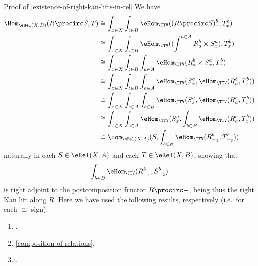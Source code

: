 \begin{Proof}{Proof of \cref{existence-of-right-kan-lifts-in-rel}}%
    We have
    \begingroup\small
    \begin{align*}
        \Hom_{\eRel(X,B)}(R\procirc S,T) &\cong  \int_{x\in X}\int_{b\in B}\eHom_{\TTV}((R\procirc S)^{b}_{x},T^{b}_{x})\\
                                         &\cong  \int_{x\in X}\int_{b\in B}\eHom_{\TTV}((\int^{a\in A}R^{b}_{a}\times S^{a}_{x}),T^{b}_{x})\\
                                         &\cong  \int_{x\in X}\int_{b\in B}\int_{a\in A}\eHom_{\TTV}(R^{b}_{a}\times S^{a}_{x},T^{b}_{x})\\
                                         &\cong  \int_{x\in X}\int_{b\in B}\int_{a\in A}\eHom_{\TTV}(S^{a}_{x},\eHom_{\TTV}(R^{b}_{a},T^{b}_{x}))\\
                                         &\cong  \int_{x\in X}\int_{a\in A}\int_{b\in B}\eHom_{\TTV}(S^{a}_{x},\eHom_{\TTV}(R^{b}_{a},T^{b}_{x}))\\
                                         &\cong  \int_{x\in X}\int_{a\in A}\eHom_{\TTV}(S^{a}_{x},\int_{b\in B}\eHom_{\TTV}(R^{b}_{a},T^{b}_{x}))\\
                                         &\cong  \Hom_{\eRel(X,A)}(S,\int_{b\in B}\eHom_{\TTV}(R^{b}_{-_{1}},T^{b}_{-_{2}}))%
    \end{align*}
    \endgroup
    naturally in each $S\in\eRel(X,A)$ and each $T\in\eRel(X,B)$, showing that
    \[
        \int_{b\in B}\eHom_{\TTV}(R^{b}_{-_{1}},S^{b}_{-_{2}})%
    \]%
    is right adjoint to the postcomposition functor $R\procirc-$, being thus the right Kan lift along $R$. Here we have used the following results, respectively (i.e.\ for each $\cong$ sign):
    \begin{enumerate}%
        \item {}.
        \item \cref{composition-of-relations}.
        \item {}.

\end{enumerate}
\end{Proof}
